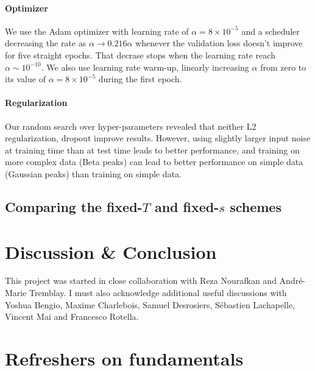 \documentclass[notitlepage, 11pt, nofootinbib]{revtex4-1}
\begin{document}
\paragraph*{Optimizer} We use the Adam optimizer with learning rate of $\alpha = 8\times10^{-5}$ and a scheduler decreasing the rate as $\alpha \rightarrow 0.216\alpha$ whenever the validation loss doesn't improve for five straight epochs. That decrase stops when the learning rate reach $\alpha\sim10^{-10}$. We also use learning rate warm-up, linearly increasing $\alpha$ from zero to its value of $\alpha = 8\times10^{-5}$ during the first epoch.

\paragraph*{Regularization} Our random search over hyper-parameters revealed that neither L2 regularization, dropout improve results. However, using slightly larger input noise at training time than at test time leads to better performance, and training on more complex data (Beta peaks) can lead to better performance on simple data (Gaussian peaks) than training on simple data.

\subsection{Comparing the fixed-$T$ and fixed-$s$ schemes}


\section{Discussion \& Conclusion}


\begin{acknowledgments}
This project was started in close collaboration with Reza Nourafkan and André-Marie Tremblay. I must also acknowledge additional useful discussions with Yoshua Bengio, Maxime Charlebois, Samuel Desrosiers, Sébastien Lachapelle, Vincent Mai and Francesco Rotella.
\end{acknowledgments}


    
\pagebreak

\appendix
{} %


\section{Refreshers on fundamentals}
\end{document}

